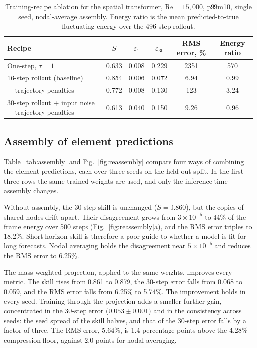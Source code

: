 \documentclass[conf]{new-aiaa}
\newcommand{\Rey}{\mathrm{Re}}
\begin{document}
\begin{table}[!tbp]
  \centering
  \caption{Training-recipe ablation for the spatial transformer, $\Rey=15{,}000$, p99m10, single seed, nodal-average assembly. Energy ratio is the mean predicted-to-true fluctuating energy over the 496-step rollout.}
  \label{tab:training}
  \begin{tabular}{lccccc}
    \toprule
    Recipe & $S$ & $\varepsilon_{1}$ & $\varepsilon_{30}$ & RMS error, \% & Energy ratio \\
    \midrule
    One-step, $\tau=1$ & 0.633 & 0.008 & 0.229 & 2351 & 570 \\
    16-step rollout (baseline) & 0.854 & 0.006 & 0.072 & 6.94 & 0.99 \\
    \quad + trajectory penalties & 0.772 & 0.008 & 0.130 & 123 & 3.24 \\
    30-step rollout + input noise + trajectory penalties & 0.613 & 0.040 & 0.150 & 9.26 & 0.96 \\
    \bottomrule
  \end{tabular}
\end{table}

\subsection{Assembly of element predictions}
\label{sec:res_assembly}
Table~\ref{tab:assembly} and Fig.~\ref{fig:reassembly} compare four ways of combining the element predictions, each over three seeds on the held-out split. In the first three rows the same trained weights are used, and only the inference-time assembly changes.

Without assembly, the 30-step skill is unchanged ($S=0.860$), but the copies of shared nodes drift apart. Their disagreement grows from $3\times10^{-5}$ to 44\% of the frame energy over 500 steps (Fig.~\ref{fig:reassembly}a), and the RMS error triples to 18.2\%. Short-horizon skill is therefore a poor guide to whether a model is fit for long forecasts. Nodal averaging holds the disagreement near $5\times10^{-5}$ and reduces the RMS error to 6.25\%.

The mass-weighted projection, applied to the same weights, improves every metric. The skill rises from 0.861 to 0.879, the 30-step error falls from 0.068 to 0.059, and the RMS error falls from 6.25\% to 5.74\%. The improvement holds in every seed. Training through the projection adds a smaller further gain, concentrated in the 30-step error ($0.053\pm0.001$) and in the consistency across seeds: the seed spread of the skill halves, and that of the 30-step error falls by a factor of three. The RMS error, 5.64\%, is 1.4 percentage points above the 4.28\% compression floor, against 2.0 points for nodal averaging.
\end{document}
